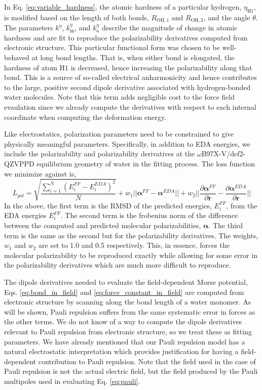 \documentclass[journal=jctcce,manuscript=article]{achemso}
\begin{document}
In Eq. \ref{eq:variable_hardness}, the atomic hardness of a particular hydrogen, $\eta_{\mathrm{H1}}$, is modified based on the length of both  bonds, $R_{\mathrm{OH,1}}$ and $R_{\mathrm{OH,2}}$, and the angle $\theta$. The parameters $k^\eta$, $k^\eta_{bb}$, and $k^\eta_{a}$ describe the magnitude of change in atomic hardness and are fit to reproduce the polarizability derivatives computed from electronic structure. This particular functional form was chosen to be well-behaved at long bond lengths. That is, when either bond is elongated, the hardness of atom $\mathrm{H1}$ is decreased, hence increasing the polarizability along that bond. This is a source of so-called electrical anharmonicity and hence contributes to the large, positive second dipole derivative associated with hydrogen-bonded water molecules.\cite{mccoy2014role} Note that this term adds negligible cost to the force field evaulation since we already compute the derivatives with respect to each internal coordinate when computing the deformation energy.

Like electrostatics, polarization parameters need to be constrained to give physically meaningful parameters. Specifically, in addition to EDA energies, we include the polarizability and polarizability derivatives at the $\omega$B97X-V/def2-QZVPPD equilibrium geometry of water in the fitting process. The loss function we minimize against is,
\begin{equation}
  L_{pol}=\sqrt{\frac{\sum_{i=1}^{N}(E_i^{FF}-E_i^{EDA})^2}{N}} + w_1||\bm{\alpha}^{FF}-\bm{\alpha}^{EDA}||+w_2||\frac{\partial\bm{\alpha}^{FF}}{\partial \bm{r}}-\frac{\partial\bm{\alpha}^{EDA}}{\partial \bm{r}}||
\label{eq:pol_loss}
\end{equation}
\noindent
In the above, the first term is the RMSD of the predicted energies, $E_i^{FF}$, from the EDA energies $E_i^{FF}$. The second term is the frobenius norm of the difference between the computed and predicted molecular polarizabilities, $\bm{\alpha}$. The third term is the same as the second but for the polarizability derivatives. The weights, $w_1$ and $w_2$ are set to 1.0 and 0.5 respectively. This, in essence, forces the molecular polarizability to be reproduced exactly while allowing for some error in the polarizability derivatives which are much more difficult to reproduce.

The dipole derivatives needed to evaluate the field-dependent Morse potential, Eqs. \ref{eq:bond_in_field} and \ref{eq:force_constant_in_field} are computed from electronic structure by scanning along the  bond length of a water monomer. As will be shown, Pauli repulsion suffers from the same systematic error in forces as the other terms. We do not know of a way to compute the dipole derivatives relevant to Pauli repulsion from electronic structure, so we treat these as fitting parameters. We have already mentioned that our Pauli repulsion model has a natural electrostatic interpretation which provides justification for having a field-dependent contribution to Pauli repulsion. Note that the field used in the case of Pauli repulsion is not the actual electric field, but the field produced by the Pauli multipoles used in evaluating Eq. \ref{eq:pauli}.
\end{document}
